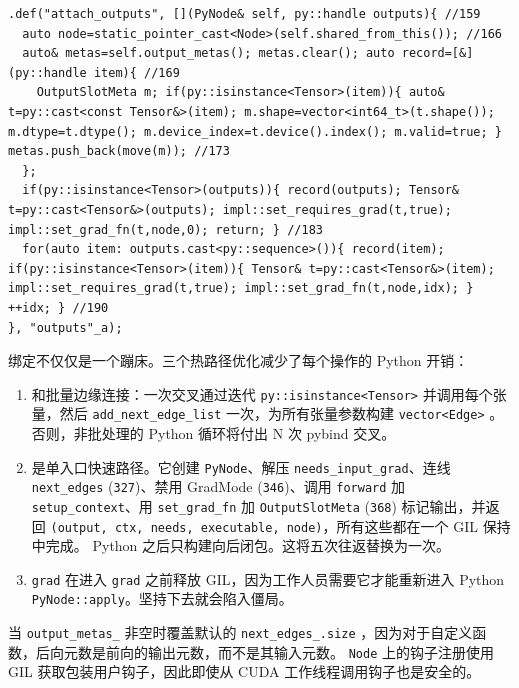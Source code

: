 \begin{lstlisting}[caption={\texttt{attach\_outputs} records hints for zero-fill.}, label=lst:attach]
.def("attach_outputs", [](PyNode& self, py::handle outputs){ //159
  auto node=static_pointer_cast<Node>(self.shared_from_this()); //166
  auto& metas=self.output_metas(); metas.clear(); auto record=[&](py::handle item){ //169
    OutputSlotMeta m; if(py::isinstance<Tensor>(item)){ auto& t=py::cast<const Tensor&>(item); m.shape=vector<int64_t>(t.shape()); m.dtype=t.dtype(); m.device_index=t.device().index(); m.valid=true; } metas.push_back(move(m)); //173
  };
  if(py::isinstance<Tensor>(outputs)){ record(outputs); Tensor& t=py::cast<Tensor&>(outputs); impl::set_requires_grad(t,true); impl::set_grad_fn(t,node,0); return; } //183
  for(auto item: outputs.cast<py::sequence>()){ record(item); if(py::isinstance<Tensor>(item)){ Tensor& t=py::cast<Tensor&>(item); impl::set_requires_grad(t,true); impl::set_grad_fn(t,node,idx); } ++idx; } //190
}, "outputs"_a);
\end{lstlisting}

绑定不仅仅是一个蹦床。三个热路径优化减少了每个操作的 Python 开销：

\begin{enumerate}[leftmargin=1.2em]
\item 和批量边缘连接：一次交叉通过迭代 \texttt{py::isinstance<Tensor>} 并调用每个张量，然后 \texttt{add\_next\_edge\_list} 一次，为所有张量参数构建 \texttt{vector<Edge>} 。否则，非批处理的 Python 循环将付出 N 次 pybind 交叉。
\item 是单入口快速路径。它创建 \texttt{PyNode}、解压 \texttt{needs\_input\_grad}、连线 \texttt{next\_edges} (\texttt{327})、禁用 GradMode (\texttt{346})、调用 \texttt{forward} 加 \texttt{setup\_context}、用 \texttt{set\_grad\_fn} 加 \texttt{OutputSlotMeta} (\texttt{368}) 标记输出，并返回 \texttt{(output, ctx, needs, executable, node)}，所有这些都在一个 GIL 保持中完成。 Python 之后只构建向后闭包。这将五次往返替换为一次。
\item \texttt{grad} 在进入 \texttt{grad} 之前释放 GIL，因为工作人员需要它才能重新进入 Python \texttt{PyNode::apply}。坚持下去就会陷入僵局。
\end{enumerate}

当 \texttt{output\_metas\_} 非空时覆盖默认的 \texttt{next\_edges\_.size} ，因为对于自定义函数，后向元数是前向的输出元数，而不是其输入元数。 \texttt{Node} 上的钩子注册使用 GIL 获取包装用户钩子，因此即使从 CUDA 工作线程调用钩子也是安全的。

